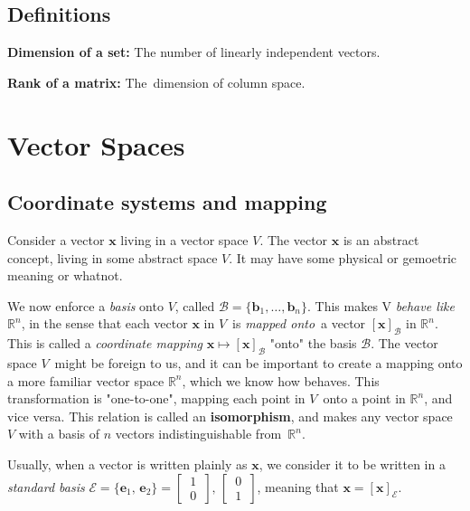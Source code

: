 \documentclass[12p,a4paper]{report}
\renewcommand{\b}{\boldsymbol}
\newcommand{\m}{\mathbb}
\begin{document}
\section*{Definitions}

\textbf{Dimension of a set:} The number of linearly independent vectors.

\textbf{Rank of a matrix:} The dimension of column space.



                                                                  
\setcounter{chapter}{3}
\chapter{Vector Spaces}
\section{Coordinate systems and mapping}
Consider a vector $\b x$ living in a vector space $V$. The vector $\b x$ is an abstract concept, living in some abstract space $V$. It may have some physical or gemoetric meaning or whatnot.

We now enforce a \textit{basis} onto $V$, called $\mathcal{B} = \{\b b_1,\dots, \b b_n\}$. This makes V \textit{behave like} $\m R^n$, in the sense that each vector $\b x$ in $V$ is \textit{mapped onto} a vector $[\b x]_\mathcal{B}$ in $\m R^n$. This is called a \textit{coordinate mapping} $\b x \mapsto [\b x]_\mathcal{B}$ "onto" the basis $\mathcal{B}$. The vector space $V$ might be foreign to us, and it can be important to create a mapping onto a more familiar vector space $\m R^n$, which we know how behaves. This transformation is "one-to-one", mapping each point in $V$ onto a point in $\m R^n$, and vice versa. This relation is called an \textbf{isomorphism}, and makes any vector space $V$ with a basis of $n$ vectors indistinguishable from $\m R^n$.

Usually, when a vector is written plainly as $\b x$, we consider it to be written in a \textit{standard basis} $\mathcal{E} = \{\b e_1,\, \b e_2\} = \begin{bmatrix} \,1\, \\ \,0\, \end{bmatrix},\, \begin{bmatrix} \,0\, \\ \,1\, \end{bmatrix}$, meaning that $\b x = [\b x]_\mathcal{E}$.
\end{document}
